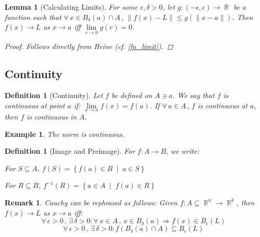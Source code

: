 \documentclass[12pt]{article}
\let\RA\Rightarrow
\let\ee\epsilon
\newcommand{\set}[2]{\left\{{#1}\;\middle|\;{#2}\right\}}
\newcommand{\Forall}[1]{\forall\,{#1}\,,\,}
\newcommand{\Exist}[1]{\exists\,{#1}:}
\DeclareMathOperator{\R}{\mathbb{R}}
\newtheorem{definition}[theorem]{Definition}
\newtheorem{lemma}[theorem]{Lemma}
\newtheorem{example}[theorem]{Example}
\newtheorem{remark}[theorem]{Remark}
\begin{document}
\begin{lemma}[Calculating Limits]
  For some $\ee,\delta>0$, let $g:(-\ee,\ee)\to\R$ be a function such that $\Forall{x\in B_\delta(a)\cap A}\|f(x)-L\|\leq g(\|x-a\|)$. Then $f(x)\to L$ as $x\to a$ iff $\lim\limits_{r\to 0}g(r)=0$.
  \begin{proof}
    Follows directly from Heine (cf. \ref{fn_limit}).
  \end{proof}
\end{lemma}

\pagebreak

\subsection{Continuity}

\begin{definition}[Continuity]
  \label{def_cont}
  Let $f$ be defined on $A\ni a$. We say that $f$ is continuous at point $a$ if: $\lim\limits_{x\to a}f(x)=f(a)$. If $\Forall{a\in A} f$ is continuous at $a$, then $f$ is continuous in $A$.
\end{definition}

\begin{example}
  \label{cont_norm}
  The norm is continuous.
\end{example}

\begin{definition}[Image and Preimage]
  \label{image_preimage}
  For $f:A\to B$, we write:
  \begin{compactitem}
    \item For $S\subseteq A$, $f(S)=\set{f(a)\in B}{a\in S}$
    \item For $R\subseteq B$, $f^{-1}(R)=\set{a\in A}{f(a)\in R}$
  \end{compactitem}
\end{definition}

\begin{remark}
  \label{cont_ball}
  Cauchy can be rephrased as follows: Given $f:A\subseteq \R^n\to\R^k$, then $f(x)\to L$ as $x\to a$ iff: $$\Forall{\ee>0}\Exist{\delta>0}\Forall{x\in A}x\in B_\delta(a)\RA f(x)\in B_\ee(L)$$
  $$\Forall{\ee>0}\Exist{\delta>0}f(B_\delta(a)\cap A)\subseteq B_\ee(L)$$
\end{remark}
\end{document}

